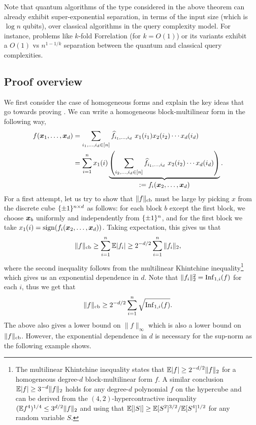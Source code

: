 Note that quantum algorithms of the type considered in the above theorem can already exhibit super-exponential separation, in terms of the input size (which is $\log n$ qubits),  over classical algorithms in the query complexity model. For instance, problems like $k$-fold Forrelation (for $k= O(1)$) or its variants exhibit a $O(1)$ vs $n^{1-1/k}$ separation \cite{BS21, SSW21} between the quantum and classical query complexities. 




\subsection{Proof overview}
\label{sec:bh}
\newcommand{\bp}{\mathbf{p}}
\newcommand{\bits}{\{0,1\}}
\newcommand{\addr}[1]{\mathrm{addr}(#1)}





We first consider the case of homogeneous forms and explain the key ideas that go towards proving . We can write a homogeneous block-multilinear form in the following way,
 \begin{align*}
    f(\boldsymbol{x}_1,\ldots, \boldsymbol{x}_d) &= \sum_{i_1, \ldots, i_d \in [n]} \widehat{f}_{i_1, \ldots, i_d} ~x_1(i_1)x_2(i_2)\cdots x_d({i_d}) \\
    \ & = \sum_{i=1}^n  x_1(i) \underbrace{\left(\sum_{i_2, \ldots, i_d \in [n]} \widehat{f}_{i_1, \ldots, i_d} ~x_2(i_2)\cdots x_d({i_d})\right)}_{\textstyle := f_i(\boldsymbol{x}_2,\ldots, \boldsymbol{x}_d)}.
\end{align*}
    For a first attempt, let us try to show that $\|f\|_{\mathrm{cb}}$ must be large by picking $x$ from the discrete cube $\{\pm 1\}^{n \times d}$ as follows: for each block $b$ except the first block, we choose $\boldsymbol{x}_b$ uniformly and independently from $\{\pm 1\}^n$, and for the first block we take $x_1(i) = \mathrm{sign}(f_i(\boldsymbol{x}_2,\ldots, \boldsymbol{x}_d))$. Taking expectation, this gives us that
 \[ 
 \|f\|_{\mathrm{cb}} \ge \sum_{i=1}^n \mathbb{E} |f_i| \ge {2^{-d/2}} \sum_{i=1}^n \|f_i\|_2,
 \]
 where the second inequality follows from the multilinear Khintchine inequality\footnote{The multilinear Khintchine inequality states that $\mathbb{E}|f| \ge 2^{-d/2} \|f\|_2$ for a homogeneous degree-$d$ block-multilinear form $f$. A similar conclusion $\mathbb{E}|f| \ge 3^{-d} \|f\|_2$ holds for any degree-$d$ polynomial $f$ on the hypercube and can be derived from the $(4,2)$-hypercontractive inequality $(\mathbb{E} f^4)^{1/4} \leq  3^{d/2}\|f\|_2$ and using that $\mathbb{E}[|S|] \geq {\mathbb{E}[S^2]^{3/2}}/{\mathbb{E}[S^4]^{1/2}}$ for any random variable $S$.} which gives us an exponential dependence in $d$. Note that $\|f_i\|_2^2 = \mathrm{Inf}_{1,i}(f)$ for each $i$, thus we get that 
  \begin{equation}\label{eq:cbnormvsinf} \|f\|_{\mathrm{cb}} \ge {2^{-d/2}} \sum_{i=1}^n  \sqrt{\mathrm{Inf}_{1,i}(f)}. 
  \end{equation}
The above also gives a lower bound on $\|f\|_{\infty}$ which is also a lower bound on $\|f\|_{\mathrm{cb}}$. However, the  exponential dependence in $d$ is necessary for the sup-norm as the following example shows. 


